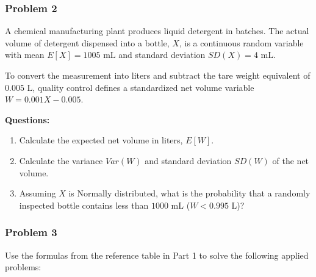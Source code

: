 \documentclass[
]{article}
\providecommand{\tightlist}{%
  \setlength{\itemsep}{0pt}\setlength{\parskip}{0pt}}
\begin{document}
\subsubsection{Problem 2}\label{problem-2}

A chemical manufacturing plant produces liquid detergent in batches. The
actual volume of detergent dispensed into a bottle, \(X\), is a
continuous random variable with mean \(E[X] = 1005\text{ mL}\) and
standard deviation \(SD(X) = 4\text{ mL}\).

To convert the measurement into liters and subtract the tare weight
equivalent of \(0.005\text{ L}\), quality control defines a standardized
net volume variable \(W = 0.001X - 0.005\).

\textbf{Questions:}

\begin{enumerate}
\def\labelenumi{\alph{enumi})}
\tightlist
\item
  Calculate the expected net volume in liters, \(E[W]\).
\item
  Calculate the variance \(Var(W)\) and standard deviation \(SD(W)\) of
  the net volume.
\item
  Assuming \(X\) is Normally distributed, what is the probability that a
  randomly inspected bottle contains less than \(1000\text{ mL}\)
  (\(W < 0.995\text{ L}\))?
\end{enumerate}

\subsubsection{Problem 3}\label{problem-3}

Use the formulas from the reference table in Part 1 to solve the
following applied problems:
\end{document}
